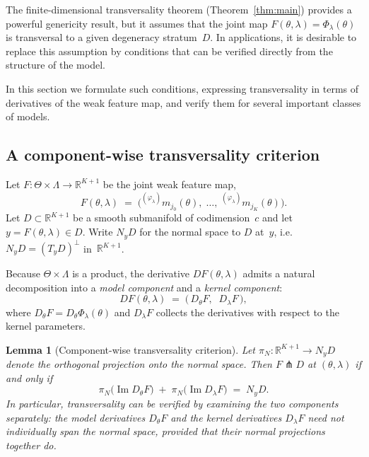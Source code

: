 \documentclass[11pt,a4paper]{article}
\newtheorem{lemma}[theorem]{Lemma}
\newcommand{\R}{\mathbb{R}}
\begin{document}
The finite-dimensional transversality theorem
(Theorem~\ref{thm:main}) provides a powerful genericity result, but it
assumes that the joint map
$F(\theta,\lambda) = \Phi_\lambda(\theta)$ is transversal to a given
degeneracy stratum~$D$.  In applications, it is desirable to replace
this assumption by conditions that can be verified directly from the
structure of the model.

In this section we formulate such conditions, expressing
transversality in terms of derivatives of the weak feature map, and
verify them for several important classes of models.


\subsection{A component-wise transversality criterion}

Let $F : \Theta \times \Lambda \to \R^{K+1}$ be the joint weak
feature map,
\[
  F(\theta,\lambda)
  \;=\;
  \bigl(
  {}^{(\varphi_\lambda)}m_{j_0}(\theta),\;
  \ldots,\;
  {}^{(\varphi_\lambda)}m_{j_K}(\theta)
  \bigr).
\]
Let $D \subset \R^{K+1}$ be a smooth submanifold of codimension~$c$
and let $y = F(\theta,\lambda) \in D$.  Write $N_y D$ for the normal
space to $D$ at~$y$, i.e.\ $N_y D = (T_y D)^\perp$ in~$\R^{K+1}$.

Because $\Theta\times\Lambda$ is a product, the derivative
$DF(\theta,\lambda)$ admits a natural decomposition into a
\emph{model component} and a \emph{kernel component}:
\begin{equation}\label{eq:DF_decomposition}
  DF(\theta,\lambda)\;=\;
  \bigl(\,D_\theta F,\;\; D_\lambda F\,\bigr),
\end{equation}
where $D_\theta F = D_\theta\Phi_\lambda(\theta)$ and $D_\lambda F$
collects the derivatives with respect to the kernel parameters.

\begin{lemma}[Component-wise transversality criterion]
\label{lem:component_transversality}
Let $\pi_N : \R^{K+1} \to N_y D$ denote the orthogonal projection
onto the normal space.  Then $F \pitchfork D$ at
$(\theta,\lambda)$ if and only if
\begin{equation}\label{eq:component_criterion}
  \pi_N\!\bigl(\operatorname{Im} D_\theta F\bigr)
  \;+\;
  \pi_N\!\bigl(\operatorname{Im} D_\lambda F\bigr)
  \;=\;
  N_y D.
\end{equation}
In particular, transversality can be verified by examining the two
components separately: the model derivatives $D_\theta F$ and
the kernel derivatives $D_\lambda F$ need not individually span the
normal space, provided that their normal projections together do.
\end{lemma}
\end{document}
